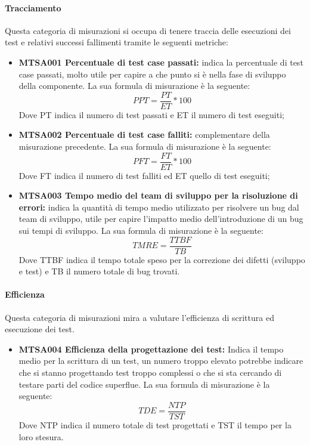 \documentclass[NormeDiProgetto.tex]{subfiles}
\begin{document}
	\paragraph{Tracciamento}
	Questa categoria di misurazioni si occupa di tenere traccia delle esecuzioni dei test e relativi successi fallimenti tramite le seguenti metriche:
	\begin{itemize}
		\item \textbf{MTSA001 Percentuale di test case passati:} indica la percentuale di test case passati, molto utile per capire a che punto si è nella fase di sviluppo della componente. La sua formula di misurazione è la seguente:
		\[PPT=\dfrac{PT}{ET}*100\]
		Dove PT indica il numero di test passati e ET il numero di test eseguiti;
		\item \textbf{MTSA002 Percentuale di test case falliti:} complementare della misurazione precedente. La sua formula di misurazione è la seguente:
		\[PFT=\dfrac{FT}{ET}*100\]
		Dove FT indica il numero di test falliti ed ET quello di test eseguiti;
		\item \textbf{MTSA003 Tempo medio del team di sviluppo per la risoluzione di errori:} indica la quantità di tempo medio utilizzato per risolvere un bug dal team di sviluppo, utile per capire l'impatto medio dell'introduzione di un bug sui tempi di sviluppo. La sua formula di misurazione è la seguente:
		\[TMRE=\dfrac{TTBF}{TB}\]
		Dove TTBF indica il tempo totale speso per la correzione dei difetti (sviluppo e test) e TB il numero totale di bug trovati.
	\end{itemize}
	
	\paragraph{Efficienza}
	Questa categoria di misurazioni mira a valutare l'efficienza di scrittura ed esecuzione dei test.
	\begin{itemize}
		\item \textbf{MTSA004 Efficienza della progettazione dei test:} Indica il tempo medio per la scrittura di un test, un numero troppo elevato potrebbe indicare che si stanno progettando test troppo complessi o che si sta cercando di testare parti del codice superflue. La sua formula di misurazione è la seguente:
		\[TDE=\dfrac{NTP}{TST}\]
		Dove NTP indica il numero totale di test progettati e TST il tempo per la loro stesura.

	\end{itemize}
\end{document}
